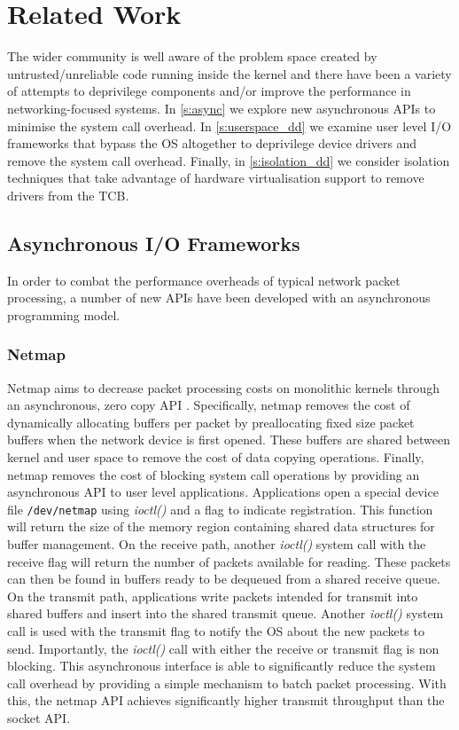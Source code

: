 \chapter{Related Work}\label{ch:related_work}

The wider community is well aware of the problem space created by untrusted/unreliable
code running inside the kernel and there have been a variety of attempts to deprivilege
components and/or improve the performance in networking-focused systems.
In \autoref{s:async} we explore new asynchronous APIs to minimise the system call overhead. In 
\autoref{s:userspace_dd} we examine user level I/O frameworks that bypass the OS altogether
to deprivilege device drivers and remove the system call overhead. Finally, in \autoref{s:isolation_dd}
we consider isolation techniques that take advantage of hardware virtualisation support to remove
drivers from the TCB.

\section{Asynchronous I/O Frameworks}\label{s:async}
In order to combat the performance overheads of typical network packet processing, a number of new APIs
have been developed with an asynchronous programming model.

\subsection{Netmap}\label{netmap}
Netmap aims to decrease packet processing costs on monolithic kernels through an asynchronous, zero copy 
API \cite{Rizzo_12}. Specifically, netmap removes the cost of dynamically allocating buffers per packet by 
preallocating fixed size packet buffers when the network device is first opened. These buffers are
shared between kernel and user space to remove the cost of data copying operations. Finally,
netmap removes the cost of blocking system call operations by providing an asynchronous API to user level applications. 
Applications open a special device file \lstinline{/dev/netmap} using \emph{ioctl()} and a flag to indicate registration.
This function will return the size of the memory region containing shared data structures for buffer management.  
On the receive path, another \emph{ioctl()} system call with the receive flag will return the number of packets available 
for reading. These packets can then be found in buffers ready to be dequeued from a shared receive queue. 
On the transmit path, applications write packets intended for transmit into shared buffers and insert into the shared transmit 
queue. Another \emph{ioctl()} system call is used with the transmit flag to notify the OS about the new 
packets to send. Importantly, the \emph{ioctl()} call with either the receive or transmit flag is non blocking.
This asynchronous interface is able to significantly reduce the system call overhead by providing a simple mechanism
to batch packet processing. With this, the netmap API achieves significantly higher transmit throughput than the
socket API.

